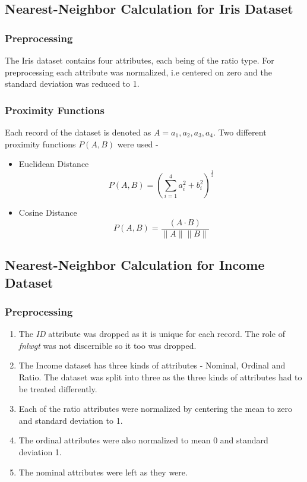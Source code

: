 \subsection{Nearest-Neighbor Calculation for Iris Dataset}
\subsubsection{Preprocessing}
The Iris dataset contains four attributes, each being of the ratio type. For preprocessing each attribute was normalized, i.e centered on zero and the standard deviation was reduced to 1.
\subsubsection{Proximity Functions}
Each record of the dataset is denoted as $A = {a_1, a_2, a_3, a_4}$.
Two different proximity functions $P(A,B)$ were used -
\begin{itemize}
	\item Euclidean Distance
		\begin{equation}
			P(A,B) = \left(\sum_{i=1}^{4} a_i^2 + b_i^2\right)^{\frac{1}{2}}
		\end{equation}
	\item Cosine Distance
		\begin{equation}
			P(A,B) = \frac{(A\cdot B)}{\lVert A\rVert \lVert B\rVert}
		\end{equation}			
\end{itemize}
\subsection{Nearest-Neighbor Calculation for Income Dataset}

\subsubsection{Preprocessing}
\begin{enumerate}
\item The \emph{ID} attribute was dropped as it is unique for each record. The role of \emph{fnlwgt} was not discernible so it too was dropped.
\item The Income dataset has three kinds of attributes - Nominal, Ordinal and Ratio. The dataset was split into three as the three kinds of attributes had to be treated differently.
\item Each of the ratio attributes were normalized by centering the mean to zero and standard deviation to 1.
\item The ordinal attributes were also normalized to mean 0 and standard deviation 1.
\item The nominal attributes were left as they were.
\end{enumerate}
